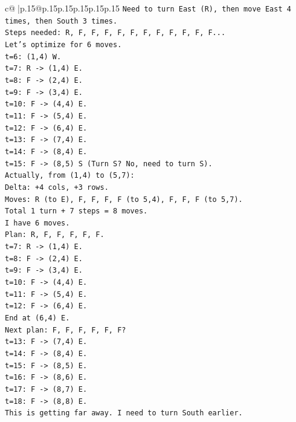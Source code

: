 \documentclass{article}
\begin{document}
{\begin{supertabular}{c@{$\;$}|p{.15\linewidth}@{}p{.15\linewidth}p{.15\linewidth}p{.15\linewidth}p{.15\linewidth}p{.15\linewidth}}
{{{\texttt{Need to turn East (R), then move East 4 times, then South 3 times.} \\
\texttt{Steps needed: R, F, F, F, F, F, F, F, F, F, F, F...} \\
\texttt{Let's optimize for 6 moves.} \\
\texttt{t=6: (1,4) W.} \\
\texttt{t=7: R {-}> (1,4) E.} \\
\texttt{t=8: F {-}> (2,4) E.} \\
\texttt{t=9: F {-}> (3,4) E.} \\
\texttt{t=10: F {-}> (4,4) E.} \\
\texttt{t=11: F {-}> (5,4) E.} \\
\texttt{t=12: F {-}> (6,4) E.} \\
\texttt{t=13: F {-}> (7,4) E.} \\
\texttt{t=14: F {-}> (8,4) E.} \\
\texttt{t=15: F {-}> (8,5) S (Turn S? No, need to turn S).} \\
\texttt{Actually, from (1,4) to (5,7):} \\
\texttt{Delta: +4 cols, +3 rows.} \\
\texttt{Moves: R (to E), F, F, F, F (to 5,4), F, F, F (to 5,7).} \\
\texttt{Total 1 turn + 7 steps = 8 moves.} \\
\texttt{I have 6 moves.} \\
\texttt{Plan: R, F, F, F, F, F.} \\
\texttt{t=7: R {-}> (1,4) E.} \\
\texttt{t=8: F {-}> (2,4) E.} \\
\texttt{t=9: F {-}> (3,4) E.} \\
\texttt{t=10: F {-}> (4,4) E.} \\
\texttt{t=11: F {-}> (5,4) E.} \\
\texttt{t=12: F {-}> (6,4) E.} \\
\texttt{End at (6,4) E.} \\
\texttt{Next plan: F, F, F, F, F, F?} \\
\texttt{t=13: F {-}> (7,4) E.} \\
\texttt{t=14: F {-}> (8,4) E.} \\
\texttt{t=15: F {-}> (8,5) E.} \\
\texttt{t=16: F {-}> (8,6) E.} \\
\texttt{t=17: F {-}> (8,7) E.} \\
\texttt{t=18: F {-}> (8,8) E.} \\
\texttt{This is getting far away. I need to turn South earlier.} \\
}}}
\end{supertabular}}
\end{document}
